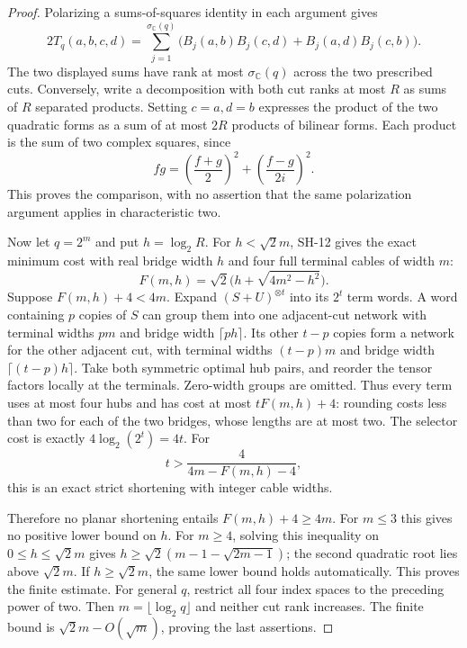 \begin{proof}
Polarizing a sums-of-squares identity in each argument gives
\[
 2T_q(a,b,c,d)=\sum_{j=1}^{\sigma_{\mathbb C}(q)}
 \bigl(B_j(a,b)B_j(c,d)+B_j(a,d)B_j(c,b)\bigr).
\]
The two displayed sums have rank at most $\sigma_{\mathbb C}(q)$
across the two prescribed cuts. Conversely, write a decomposition
with both cut ranks at most $R$ as sums of $R$ separated products.
Setting $c=a,d=b$ expresses the product of the two quadratic forms
as a sum of at most $2R$ products of bilinear forms. Each product is
the sum of two complex squares, since
\[
 fg=\left(\frac{f+g}{2}\right)^2
      +\left(\frac{f-g}{2i}\right)^2.
\]
This proves the comparison, with no assertion that the same
polarization argument applies in characteristic two.

Now let $q=2^m$ and put $h=\log_2R$. For $h<\sqrt2m$, SH-12 gives
the exact minimum cost with real bridge width $h$ and four full
terminal cables of width $m$:
\[
 F(m,h)=\sqrt2\bigl(h+\sqrt{4m^2-h^2}\bigr).
\]
Suppose $F(m,h)+4<4m$. Expand $(S+U)^{\otimes t}$ into its $2^t$
term words. A word containing $p$ copies of $S$ can group them into
one adjacent-cut network with terminal widths $pm$ and bridge width
$\lceil ph\rceil$. Its other $t-p$ copies form a network for the
other adjacent cut, with terminal widths $(t-p)m$ and bridge width
$\lceil(t-p)h\rceil$. Take both symmetric optimal hub pairs, and
reorder the tensor factors locally at the terminals. Zero-width
groups are omitted. Thus every term uses at most four hubs and has
cost at most $tF(m,h)+4$: rounding costs less than two for each
of the two bridges, whose lengths are at most two. The selector
cost is exactly $4\log_2(2^t)=4t$. For
\[
 t>\frac{4}{4m-F(m,h)-4},
\]
this is an exact strict shortening with integer cable widths.

Therefore no planar shortening entails $F(m,h)+4\geq4m$.
For $m\leq3$ this gives no positive lower bound on $h$. For
$m\geq4$, solving this inequality on $0\leq h\leq\sqrt2m$
gives
$h\geq\sqrt2(m-1-\sqrt{2m-1})$; the second quadratic root
lies above $\sqrt2m$. If $h\geq\sqrt2m$, the same lower bound
holds automatically. This proves the finite estimate. For general
$q$, restrict all four index spaces to the preceding power of two.
Then $m=\lfloor\log_2q\rfloor$ and neither cut rank increases.
The finite bound is $\sqrt2m-O(\sqrt m)$, proving the last
assertions.
\end{proof}

